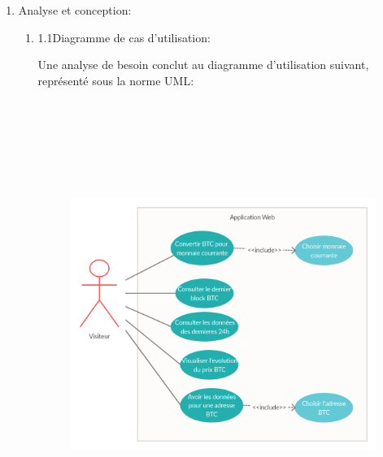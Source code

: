\documentclass[12pt]{article}
\begin{document}
\begin{enumerate}
\vspace{\baselineskip}

\vspace{\baselineskip}

\vspace{\baselineskip}

\vspace{\baselineskip}

\vspace{\baselineskip}

\vspace{\baselineskip}
	\item Analyse et conception:\par

\begin{enumerate}
	\item 1.1\tab Diagramme de cas d’utilisation:\par

Une analyse de besoin conclut au diagramme d’utilisation suivant, représenté sous la norme UML:\par




\begin{figure}[H]
\advance\leftskip -0.12in		\includegraphics[width=6.94in,height=5.75in]{./media/image2.png}
\end{figure}




\end{enumerate}
\end{enumerate}
\end{document}
